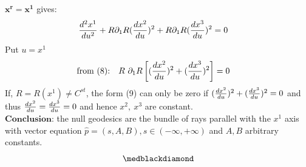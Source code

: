 $\boldsymbol{x^r = x^1}$ gives:
\begin{align}\dv[2] {x^1}{u} +R\partial_1R(\dv{x^2}{u})^2+R \partial_1  R(\dv{x^3}{u})^2 &= 0
\end{align}
Put $ u = x^1$
\begin{align}
\text{from (8):}\quad R \ \partial_1 R \left[ (\dv{x^2}{u})^2+(\dv{x^3}{u})^2 \right] &= 0
\end{align}
If, $R= R(x^1) \ne C^{st}$, the form (9) can only be zero if $(\dv{x^2}{u})^2+(\dv{x^3}{u})^2 = 0$ and thus $\dv{x^2}{u}=\dv{x^3}{u} = 0$ and hence $x^2, \ x^3 $ are constant.\\
$\textbf{Conclusion:}$ the null geodesics are the bundle of rays parallel with the $x^1$ axis with vector equation $\widehat{p} = (s,A,B), s \in (-\infty, +\infty)$ and $A,B$ arbitrary constants.
$$\medblackdiamond$$
\newpage

